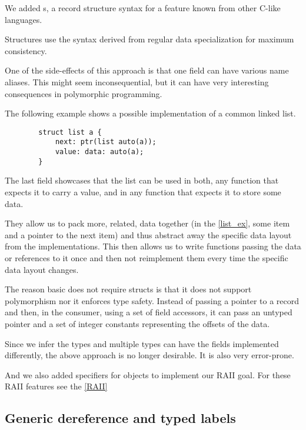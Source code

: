 We added s, a record structure syntax for a feature known from other C-like languages.

Structures use the syntax derived from regular data specialization for maximum consistency.

One of the side-effects of this approach is that one field can have various name aliases. This might seem inconsequential, but it can have very interesting consequences in polymorphic programming.

\begin{ex}
    \label{list_ex}
    The following example shows a possible implementation of a common linked list.

    \begin{lstlisting}
        struct list a {
            next: ptr(list auto(a));
            value: data: auto(a);
        }
    \end{lstlisting}

    The last field showcases that the list can be used in both, any function that expects it to carry a value, and in any function that expects it to store some data.
\end{ex}

They allow us to pack more, related, data together (in the \cref{list_ex}, some item and a pointer to the next item) and thus abstract away the specific data layout from the implementations. This then allows us to write functions passing the data or references to it once and then not reimplement them every time the specific data layout changes.

The reason basic \cmm{} does not require structs is that it does not support polymorphism nor it enforces type safety. Instead of passing a pointer to a record and then, in the consumer, using a set of field accessors, it can pass an untyped pointer and a set of integer constants representing the offsets of the data.

Since we infer the types and multiple types can have the fields implemented differently, the above approach is no longer desirable. It is also very error-prone.

And we also added  specifiers for  objects to implement our RAII goal. For these RAII features see the \cref{RAII}

\subsection{Generic dereference and typed labels}

